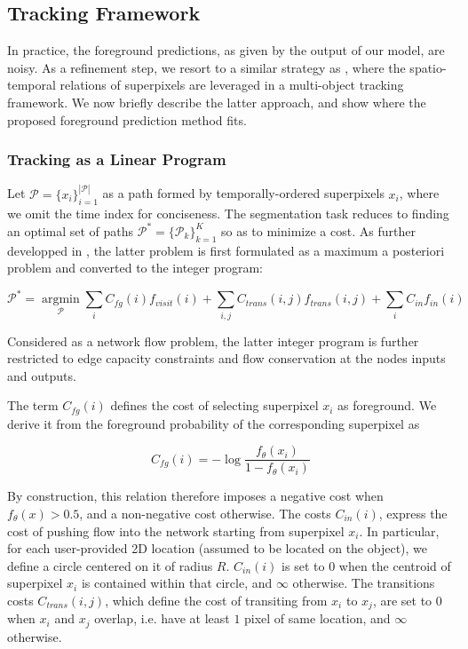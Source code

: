 \subsection{Tracking Framework}
\label{sec:tracking}
In practice, the foreground predictions, as given by the output of our model, are noisy.
As a refinement step, we resort to a similar strategy as \cite{lejeune18}, where the spatio-temporal relations of superpixels are leveraged in a multi-object tracking framework.
We now briefly describe the latter approach, and show where the proposed foreground prediction method fits.


\subsubsection{Tracking as a Linear Program}
\label{sec:orgcf5c794}
Let \(\mathcal{P}=\{x_i\}_{i=1}^{|\mathcal{P}|}\) as a path formed by temporally-ordered superpixels \(x_{i}\), where we omit the time index for conciseness.
The segmentation task reduces to finding an optimal set of paths \(\bm{\mathcal{P}}^*=\{ \mathcal{P}_k\}_{k=1}^K\) so as to minimize a cost.
As further developped in \cite{lejeune18}, the latter problem is first formulated as a maximum a posteriori problem and converted to the integer program:

\begin{equation}
\label{eq:lin_prog}
\bm{\mathcal{P}}^* = \operatorname*{argmin}_{\bm{\mathcal{P}}} \sum_i C_{fg}(i) f_{visit}(i) + \sum_{i,j} C_{trans}(i,j)f_{trans}(i,j) + \sum_{i} C_{in} f_{in}(i)
\end{equation}

Considered as a network flow problem, the latter integer program is further restricted to edge capacity constraints and flow conservation at the nodes inputs and outputs.

The term $C_{fg}(i)$ defines the cost of selecting superpixel $x_i$ as foreground.
We derive it from the foreground probability of the corresponding superpixel as

\begin{equation}
  \label{eq:cost_fg}
  C_{fg}(i) = -\log \frac{f_\theta(x_i)}{1-f_\theta(x_i)}
\end{equation}

By construction, this relation therefore imposes a negative cost when $f_{\theta}(x) > 0.5$, and a non-negative cost otherwise.
The costs $C_{in}(i)$, express the cost of pushing flow into the network starting from superpixel $x_{i}$.
In particular, for each user-provided 2D location (assumed to be located on the object), we define a circle centered on it of radius $R$.
$C_{in}(i)$ is set to $0$ when the centroid of superpixel $x_i$ is contained within that circle, and $\infty$ otherwise.
The transitions costs $C_{trans}(i,j)$, which define the cost of transiting from $x_i$ to $x_j$, are set to $0$ when $x_i$ and $x_j$ overlap, i.e. have at least $1$ pixel of same location, and $\infty$ otherwise.


